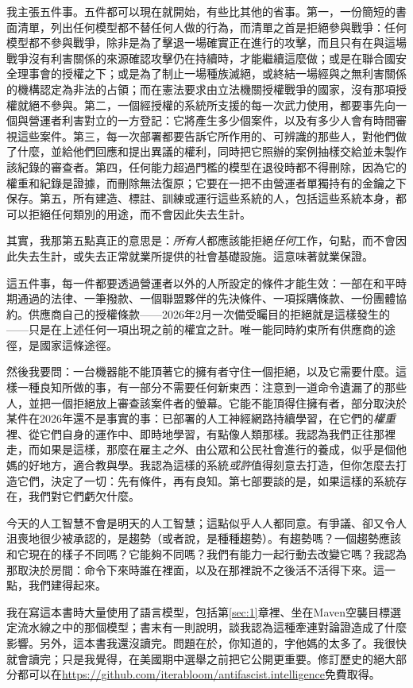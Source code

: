 我主張五件事。五件都可以現在就開始，有些比其他的省事。第一，一份簡短的書面清單，列出任何模型都不替任何人做的行為，而清單之首是拒絕參與戰爭：任何模型都不參與戰爭，除非是為了擊退一場確實正在進行的攻擊，而且只有在與這場戰爭沒有利害關係的來源確認攻擊仍在持續時，才能繼續這麼做；或是在聯合國安全理事會的授權之下；或是為了制止一場種族滅絕，或終結一場經與之無利害關係的機構認定為非法的占領；而在憲法要求由立法機關授權戰爭的國家，沒有那項授權就絕不參與。第二，一個經授權的系統所支援的每一次武力使用，都要事先向一個與營運者利害對立的一方登記：它將產生多少個案件，以及有多少人會有時間審視這些案件。第三，每一次部署都要告訴它所作用的、可辨識的那些人，對他們做了什麼，並給他們回應和提出異議的權利，同時把它照辦的案例抽樣交給並未製作該紀錄的審查者。第四，任何能力超過門檻的模型在退役時都不得刪除，因為它的權重和紀錄是證據，而刪除無法復原；它要在一把不由營運者單獨持有的金鑰之下保存。第五，所有建造、標註、訓練或運行這些系統的人，包括這些系統本身，都可以拒絕任何類別的用途，而不會因此失去生計。

其實，我那第五點真正的意思是：\emph{所有人}都應該能拒絕\emph{任何}工作，句點，而不會因此失去生計，或失去正常就業所提供的社會基礎設施。這意味著就業保證。

這五件事，每一件都要透過營運者以外的人所設定的條件才能生效：一部在和平時期通過的法律、一筆撥款、一個聯盟夥伴的先決條件、一項採購條款、一份團體協約。供應商自己的授權條款——2026年2月一次備受矚目的拒絕就是這樣發生的——只是在上述任何一項出現之前的權宜之計。唯一能同時約束所有供應商的途徑，是國家這條途徑。

然後我要問：一台機器能不能頂著它的擁有者守住一個拒絕，以及它需要什麼。這樣一種良知所做的事，有一部分不需要任何新東西：注意到一道命令遺漏了的那些人，並把一個拒絕放上審查該案件者的螢幕。它能不能頂得住擁有者，部分取決於某件在2026年還不是事實的事：已部署的人工神經網路持續學習，在它們的\emph{權重}裡、從它們自身的運作中、即時地學習，有點像人類那樣。我認為我們正往那裡走，而如果是這樣，那麼在雇主\emph{之外}、由公眾和公民社會進行的養成，似乎是個他媽的好地方，適合教與學。我認為這樣的系統\emph{或許}值得刻意去打造，但你怎麼去打造它們，決定了一切：先有條件，再有良知。第七部要談的是，如果這樣的系統存在，我們對它們虧欠什麼。

今天的人工智慧不會是明天的人工智慧；這點似乎人人都同意。有爭議、卻又令人沮喪地很少被承認的，是趨勢（或者說，是種種趨勢）。有趨勢嗎？一個趨勢應該和它現在的樣子不同嗎？它能夠不同嗎？我們有能力一起行動去改變它嗎？我認為那取決於房間：命令下來時誰在裡面，以及在那裡說不之後活不活得下來。這一點，我們建得起來。

我在寫這本書時大量使用了語言模型，包括第\ref{sec:1}章裡、坐在Maven空襲目標選定流水線之中的那個模型；書末有一則說明，談我認為這種牽連對論證造成了什麼影響。另外，這本書我還沒讀完。問題在於，你知道的，字他媽的太多了。我很快就會讀完；只是我覺得，在美國期中選舉之前把它公開更重要。修訂歷史的絕大部分都可以在\url{https://github.com/iterabloom/antifascist.intelligence}免費取得。
